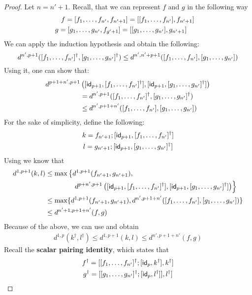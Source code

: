 \begin{proof}
	Let $n = n' + 1$. Recall, that we can represent $f$ and $g$ in the following way
	\begin{gather*}
		f = [ f_1, \dots, f_{n'}, f_{n' + 1} ] = [ [ f_1, \dots, f_{n'} ] , f_{n' + 1}]\\
		g = [ g_1, \dots, g_{n'}, f_{g' + 1} ] = [ [ g_1, \dots, g_{n'} ] , g_{n' + 1}]\qquad
	\end{gather*}
	We can apply the induction hypothesis and obtain the following:
	$$
	d^{n', p + 1}([ f_1, \dots, f_{n'}]^\dagger, [ g_1, \dots, g_{n'}]^\dagger ) \leq d^{n', n' + p + 1}([ f_1, \dots, f_{n'}], [ g_1, \dots, g_{n'}] ) 
	$$
	Using it, one can show that:
	\begin{align*}
	d^{p + 1 + n' , p + 1}&\left([\mathsf{id}_{p + 1},[ f_1, \dots, f_{n'}]^\dagger ],[\mathsf{id}_{p + 1},[ g_1, \dots, g_{n'}]^\dagger] \right)\\ &=d^{n', p + 1}([ f_1, \dots, f_{n'}]^\dagger, [ g_1, \dots, g_{n'}]^\dagger)\\
	&\leq  d^{n', p + 1 + n'}([ f_1, \dots, f_{n'}], [ g_1, \dots, g_{n'}] ) 
	\end{align*}
	For the sake of simplicity, define the following:
	\begin{gather*}
	k = f_{n' + 1};[\mathsf{id}_{p + 1} ,[ f_1, \dots, f_{n'}]^\dagger]\\
	l = g_{n' + 1};[\mathsf{id}_{p + 1} ,[ g_1, \dots, g_{n'}]^\dagger]
	\end{gather*}
	Using  we know that 
	\begin{align*}
	d^{1,p+1}(k,l)&\leq \max\left\{d^{1,p + 1}(f_{n' + 1},g_{n' + 1}),\right.\\&\qquad\qquad\left. d^{p + n', p + 1}\left([\mathsf{id}_{p + 1} ,[ f_1, \dots, f_{n'}]^\dagger],[\mathsf{id}_{p + 1} ,[ g_1, \dots, g_{n'}]^\dagger ] \right) \right\}\\
	&\leq \max \{d^{1,p + 1}(f_{n' + 1},g_{n' + 1}), d^{n', p + 1 + n'}([ f_1, \dots, f_{n'}], [ g_1, \dots, g_{n'}] ) \} \\
	&\leq d^{n' + 1, p + 1 + n'}(f,g)
	\end{align*}
	Because of the above, we can use  and obtain
	\begin{align*}
		d^{1,p}(k^\dagger, l^\dagger) \leq 	d^{1,p + 1}(k,l) \leq d^{n', p + 1 + n'}(f,g)
	\end{align*}
	Recall the \textbf{scalar pairing identity}, which states that
	\begin{gather*}
	f^\dagger = [[ f_1, \dots, f_{n'}]^\dagger ; [ \mathsf{id}_p ,k^\dagger] , k^\dagger] \\
	g^\dagger = [[ g_1, \dots, g_{n'}]^\dagger ; [ \mathsf{id}_p, l^\dagger ]  ], l^\dagger]
	\end{gather*}
	

\end{proof}
